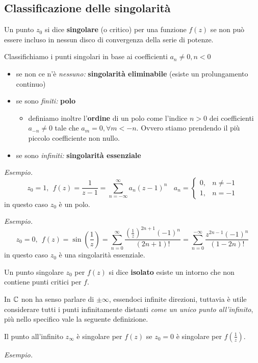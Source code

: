 \subsection{Classificazione delle singolarità}

\begin{defn}
Un punto $z_{0}$ si dice \textbf{singolare} (o critico) per una funzione $f(z)$ se non può essere incluso in nessun disco di convergenza della serie di potenze.
\end{defn}
Classifichiamo i punti singolari in base ai coefficienti $a_{n} \neq 0, n < 0$
\begin{itemize}
\item se non ce n'è \textit{nessuno:} \textbf{singolarità eliminabile} (esiste un prolungamento continuo)
\item se sono \textit{finiti:} \textbf{polo}
\begin{itemize}
\item definiamo inoltre l'\textbf{ordine} di un polo come l'indice $n > 0$ dei coefficienti $a_{- n} \neq 0$ tale che $a_{m} = 0, \forall m < - n$. Ovvero stiamo prendendo il più piccolo coefficiente non nullo.
\end{itemize}
\item se sono \textit{infiniti:} \textbf{singolarità essenziale}
\end{itemize}

\textit{Esempio.}
\begin{equation*}
z_{0} = 1, \ \ f(z) = \frac{1}{z - 1} = \sum\limits^{\infty}_{n = - \infty} a_{n}(z - 1)^{n} \ \ \ \ a_{n} =
\begin{cases}
0, & n\neq - 1\\
1, & n = - 1
\end{cases}
\end{equation*}
in questo caso $z_{0}$ è un polo.

\textit{Esempio.}
\begin{equation*}
z_{0} = 0, \ \ f(z) = \sin\left(\frac{1}{z}\right) = \sum\limits^{\infty}_{n = 0}\frac{\left(\frac{1}{z}\right)^{2n + 1}(- 1)^{n}}{(2n + 1) !} = \sum\limits^{- \infty}_{n = 0}\frac{z^{2n - 1}(- 1)^{n}}{(1 - 2n) !}
\end{equation*}
in questo caso $z_{0}$ è una singolarità essenziale.
\begin{defn}
Un punto singolare $z_{0}$ per $f(z)$ si dice \textbf{isolato} esiste un intorno che non contiene punti critici per $f$.
\end{defn}
In $\mathbb{C}$ non ha senso parlare di $\pm \infty $, essendoci infinite direzioni, tuttavia è utile considerare tutti i punti infinitamente distanti \textit{come un unico punto all'infinito}, più nello specifico vale la seguente definizione.
\begin{defn}
 Il punto all'infinito $z_{\infty}$ è singolare per $f(z)$ se $z_{0} = 0$ è singolare per $f\left(\frac{1}{z}\right)$.
\end{defn}
\textit{Esempio.}

